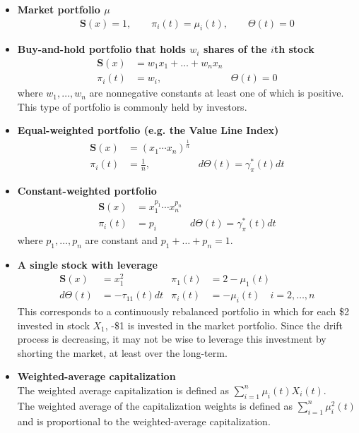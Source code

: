 \documentclass[a4paper,landscape,8pt,fleqn]{scrartcl}
\renewcommand{\emph}[1]{\textbf{#1}}
\begin{document}
\begin{multicols*}{3}
\begin{itemize}
\item \emph{Market portfolio $\mu$}
\begin{align*}
\pmb{S}(x) = 1, \qquad \pi_i(t) = \mu_i(t), \qquad \Theta(t) = 0
\end{align*}
\item \emph{Buy-and-hold portfolio that holds $w_i$ shares of the $i$th stock}
\begin{align*}
\pmb{S}(x) &= w_1 x_1 + \ldots + w_n x_n \\
\pi_i(t) &= w_i, & \Theta(t) = 0
\end{align*}
where $w_1, \ldots, w_n$ are nonnegative constants at least one of which is positive. This type of portfolio is commonly held by investors.
\item \emph{Equal-weighted portfolio (e.g. the Value Line Index)}
\begin{align*}
\pmb{S}(x) &= (x_1 \cdots x_n)^{\frac{1}{n}} \\
\pi_i(t) &= \frac{1}{n}, & d\Theta(t) = \gamma_\pi^\ast(t) dt
\end{align*}
\item \emph{Constant-weighted portfolio}
\begin{align*}
\pmb{S}(x) &= x_1^{p_1} \cdots x_n^{p_n} \\
\pi_i(t) &= p_i & d\Theta(t) = \gamma_\pi^\ast(t) dt
\end{align*}
where $p_1, \ldots, p_n$ are constant and $p_1 + \ldots + p_n = 1$.
\item \emph{A single stock with leverage}
\begin{align*}
\pmb{S}(x) &= x_1^2 & \pi_1(t) &= 2 - \mu_1(t) \\
d\Theta(t) &= -\tau_{11}(t) dt & \pi_i(t) &= - \mu_i(t) \quad i = 2, \ldots, n
\end{align*}
This corresponds to a continuously rebalanced portfolio in which for each \$2 invested in stock $X_1$, -\$1 is invested in the market portfolio. Since the drift process is decreasing, it may not be wise to leverage this investment by shorting the market, at least over the long-term.
\item \emph{Weighted-average capitalization} \\
The weighted average capitalization is defined as $\sum_{i=1}^n \mu_i(t) X_i(t)$. \\
The weighted average of the capitalization weights is defined as $\sum_{i=1}^n \mu_i^2(t)$ and is proportional to the weighted-average capitalization. \\

\end{itemize}
\end{multicols*}
\end{document}
